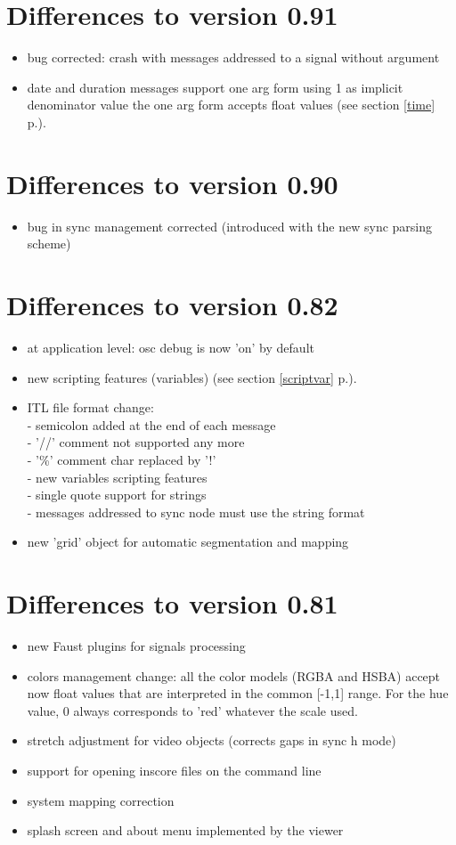 \documentclass[a4paper,twoside]{report}
\newcommand{\sublevel}[1]	{\section{#1}}
\newcommand{\fullref}[1]	{\ref{#1} p.\pageref{#1}}
\begin{document}
\sublevel{Differences to version 0.91}
\begin{itemize}
\item bug corrected: crash with messages addressed to a signal without argument
\item date and duration messages support one arg form using 1 as implicit denominator value 
  the one arg form accepts float values  (see section \fullref{time}).
\end{itemize}

\sublevel{Differences to version 0.90}
\begin{itemize}
\item bug in sync management corrected (introduced with the new sync parsing scheme)
\end{itemize}

\sublevel{Differences to version 0.82}
\begin{itemize}
\item at application level: osc debug is now 'on' by default
\item new scripting features (variables)  (see section \fullref{scriptvar}).
\item ITL file format change: \\
  - semicolon added at the end of each message \\
  - '//' comment not supported any more \\
  - '\%' comment char replaced by '!' \\
  - new variables scripting features \\
  - single quote support for strings \\
  - messages addressed to sync node must use the string format
\item new 'grid' object for automatic segmentation and mapping
\end{itemize}

\sublevel{Differences to version 0.81}
\begin{itemize}
\item new Faust plugins for signals processing
\item colors management change: all the color models (RGBA and HSBA) accept now
  float values that are interpreted in the common [-1,1] range. For the
  hue value, 0 always corresponds to 'red' whatever the scale used.
\item stretch adjustment for video objects (corrects gaps in sync h mode)
\item support for opening inscore files on the command line
\item system mapping correction
\item splash screen and about menu implemented by the viewer
\end{itemize}
\end{document}
